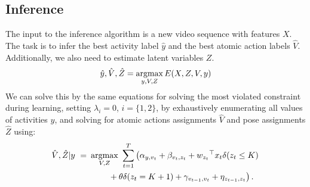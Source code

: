 \subsection{Inference}
The input to the inference algorithm is a new video sequence with features
$X$. The task is to infer the best activity label $\hat y$ and the best
atomic action labels $\hat V$. Additionally, we also need to estimate latent variables $Z$.
\begin{equation}
  \hat y, \hat V, \hat Z = \operatorname*{argmax}_{y, V, Z} E(X, Z, V, y)
\end{equation}
We can solve this by the same equations for solving the most violated constraint during learning, setting %
$\lambda_i =0$, $i = \{1,2\}$, by exhaustively enumerating all values of activities $y$, and solving for atomic actions assignments $\hat{V}$ and pose assignments $\hat{Z}$ using:
\begin{equation}
\begin{split}
 \hat{V}, \hat{Z} | y ~ =~ &   \argmax_{V,Z} ~   \sum_{t=1}^T \left( \alpha_{y,v_{t}} 
                  + \beta_{v_{t},z_{t}} + {w_{z_{t}}}^\top x_{t} \delta(z_t \le K)  \right. \\ 
				& \quad\quad \left. \vphantom{{w_{z_{t}}}^\top x_{t}} + \theta \delta(z_t = K+1) + \gamma_{v_{{t-1}},v_t} + \eta_{z_{{t-1}},z_t}  \right). \\
\end{split}
\label{eq:classify_inference}
\end{equation}
